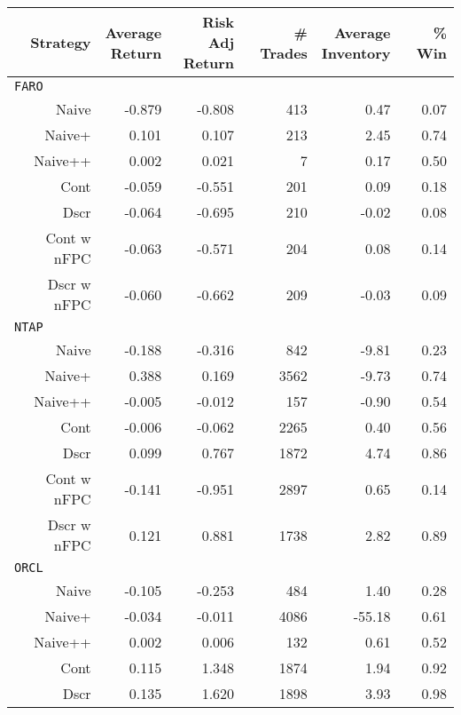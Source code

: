 \begin{table}
\centering
{}
\setlength{\tabcolsep}{9pt}
\begin{tabular}{@{} *{6}{r} @{}}
\toprule
Strategy & \cellbreak{t}{r}{Average \\ Return} & \cellbreak{t}{r}{Risk Adj \\ Return} & \cellbreak{t}{r}{\# Trades \\ \hphantom{Risk Adj}} & \cellbreak{t}{r}{Average \\ Inventory} & \cellbreak{t}{r}{\% Win \\ \hphantom{Risk Adj}} \\
\midrule
\multicolumn{6}{l}{\texttt{FARO}} \\
Naive & -0.879 & -0.808 & 413 & 0.47 & 0.07  \\ 
Naive+ & 0.101 & 0.107 & 213 & 2.45 & 0.74  \\ 
Naive++ & 0.002 & 0.021 & 7 & 0.17 & 0.50  \\ 
Cont & -0.059 & -0.551 & 201 & 0.09 & 0.18  \\ 
Dscr & -0.064 & -0.695 & 210 & -0.02 & 0.08  \\ 
Cont w nFPC & -0.063 & -0.571 & 204 & 0.08 & 0.14  \\ 
Dscr w nFPC & -0.060 & -0.662 & 209 & -0.03 & 0.09  \\[2ex]
\multicolumn{6}{l}{\texttt{NTAP}} \\
Naive & -0.188 & -0.316 & 842 & -9.81 & 0.23 \\ 
Naive+ & 0.388 & 0.169 & 3562 & -9.73 & 0.74 \\ 
Naive++ & -0.005 & -0.012 & 157 & -0.90 & 0.54  \\ 
Cont & -0.006 & -0.062 & 2265 & 0.40 & 0.56  \\ 
Dscr & 0.099 & 0.767 & 1872 & 4.74 & 0.86  \\ 
Cont w nFPC & -0.141 & -0.951 & 2897 & 0.65 & 0.14 \\ 
Dscr w nFPC & 0.121 & 0.881 & 1738 & 2.82 & 0.89  \\[2ex]
\multicolumn{6}{l}{\texttt{ORCL}} \\
Naive & -0.105 & -0.253 & 484 & 1.40 & 0.28  \\ 
Naive+ & -0.034 & -0.011 & 4086 & -55.18 & 0.61 \\ 
Naive++ & 0.002 & 0.006 & 132 & 0.61 & 0.52 \\ 
Cont & 0.115 & 1.348 & 1874 & 1.94 & 0.92 \\ 
Dscr & 0.135 & 1.620 & 1898 & 3.93 & 0.98 \\ 

\end{tabular}
\end{table}
